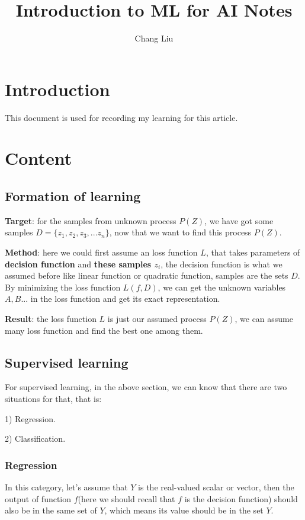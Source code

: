 \documentclass{article}
\author{Chang Liu}
\title{Introduction to ML for AI \- Notes}
\begin{document}
\maketitle

\section{Introduction}
This document is used for recording my learning for this article.

\section{Content}

\subsection{Formation of learning}
\textbf{Target}: for the samples from unknown process $P(Z)$, we have got some samples $D=\{z_{1}, z_{2}, z_{3}, ... z_{n}\}$, now that we want to find this process $P(Z)$.\newline

\noindent \textbf{Method}: here we could first assume an loss function $L$, that takes parameters of \textbf{decision function} and \textbf{these samples $z_{i}$}, the decision function is what we assumed before like linear function or quadratic function, samples are the sets $D$. By minimizing the loss function $L(f, D)$, we can get the unknown variables $A, B...$ in the loss function and get its exact representation.\newline

\noindent \textbf{Result}: the loss function $L$ is just our assumed process $P(Z)$, we can assume many loss function and find the best one among them.


\subsection{Supervised learning}
For supervised learning, in the above section, we can know that there are two situations for that, that is:

1) Regression.

2) Classification.


\subsubsection{Regression}
In this category, let's assume that $Y$ is the real-valued scalar or vector, then the output of function $f$(here we should recall that $f$ is the decision function) should also be in the same set of $Y$, which means its value should be in the set $Y$.
\end{document}
